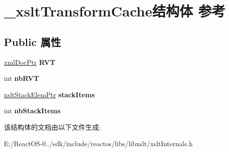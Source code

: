 \hypertarget{struct__xslt_transform_cache}{}\section{\+\_\+xslt\+Transform\+Cache结构体 参考}
\label{struct__xslt_transform_cache}
\subsection*{Public 属性}
\begin{DoxyCompactItemize}
\item 
\mbox{\label{struct__xslt_transform_cache_a8cf7e3ebb508d174b5618bb0a30e67e8}} 
\hyperlink{struct__xml_doc}{xml\+Doc\+Ptr} {\bfseries R\+VT}
\item 
\mbox{\label{struct__xslt_transform_cache_ae33477d92a5cfe2092217397e6fb6696}} 
int {\bfseries nb\+R\+VT}
\item 
\mbox{\label{struct__xslt_transform_cache_aafbe656d23e5d7dae638537d95f98a9a}} 
\hyperlink{struct__xslt_stack_elem}{xslt\+Stack\+Elem\+Ptr} {\bfseries stack\+Items}
\item 
\mbox{\label{struct__xslt_transform_cache_afcbf2d2f023dd7d7ee06ed0107f7f28b}} 
int {\bfseries nb\+Stack\+Items}
\end{DoxyCompactItemize}


该结构体的文档由以下文件生成\+:\begin{DoxyCompactItemize}
\item 
E\+:/\+React\+O\+S-\/0../sdk/include/reactos/libs/libxslt/xslt\+Internals.\+h\end{DoxyCompactItemize}
